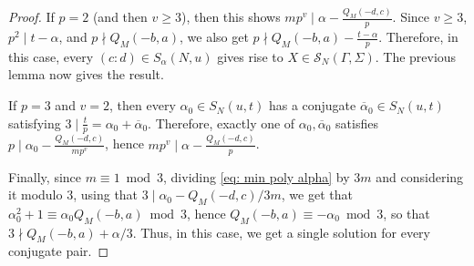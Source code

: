 \documentclass[12pt]{amsart}
\newcommand{\calS}{\mathcal{S}}
\numberwithin{equation}{subsection}
\theoremstyle{plain}\newtheorem{ithm}{Theorem}
\theoremstyle{plain}\newtheorem{iprop}[ithm]{Proposition}
\theoremstyle{definition}
\theoremstyle{remark}
\begin{document}
\begin{proof}
    If $p = 2$ (and then $v \ge 3$), then this shows $mp^v \mid \alpha - \tfrac{Q_M(-d,c)}{p}$. 
    Since $v \ge 3$, $p^2 \mid t - \alpha$, and $p \nmid Q_M(-b,a)$, we also get $p \nmid Q_M(-b,a) - \tfrac{t - \alpha}{p}$.
    Therefore, in this case, every $(c:d) \in S_{\alpha}(N,u)$ gives rise to $X \in \calS_N(\Gamma, \Sigma)$. The previous lemma now gives the result.

    If $p = 3$ and $v = 2$, then every $\alpha_0 \in S_N(u,t)$ has a conjugate $\overline{\alpha}_0 \in S_N(u,t)$ satisfying $3 \mid \tfrac{t}{p} = \alpha_0 + \overline{\alpha}_0$. Therefore, exactly one of $\alpha_0, \overline{\alpha}_0$ satisfies $p \mid \alpha_0 - \tfrac{Q_M(-d,c)}{mp^v}$, hence $mp^v \mid \alpha - \frac{Q_M(-d,c)}{p}$. 

    Finally, since $m \equiv 1 \bmod 3$, dividing \eqref{eq: min poly alpha} by $3m$ and considering it modulo $3$, using that $3 \mid \alpha_0 - Q_M(-d,c)/3m$, we get that $\alpha_0^2 + 1 \equiv \alpha_0 Q_M(-b,a) \bmod 3$, hence $Q_M(-b,a) \equiv -\alpha_0 \bmod 3$, so that $3 \nmid Q_M(-b,a) + \alpha / 3$.
    Thus, in this case, we get a single solution for every conjugate pair.
\end{proof}
\end{document}
